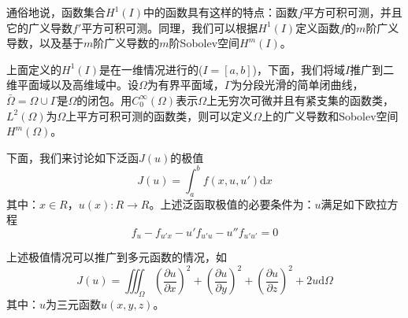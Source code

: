             通俗地说，函数集合$H^1(I)$中的函数具有这样的特点：函数$f$平方可积可测，并且它的广义导数$f'$平方可积可测。同理，我们可以根据$H^1(I)$定义函数$f$的$m$阶广义导数，以及基于$m$阶广义导数的$m$阶Sobolev空间$H^m(I)$。
            \par
            上面定义的$H^1(I)$是在一维情况进行的($I = [a,b]$)，下面，我们将域$I$推广到二维平面域以及高维域中。设$\Omega$为有界平面域，$\Gamma$为分段光滑的简单闭曲线，$\bar{\Omega} = \Omega\cup \Gamma$是$\Omega$的闭包。用$C_0^\infty(\Omega)$表示$\Omega$上无穷次可微并且有紧支集的函数类，$L^2(\Omega)$为$\Omega$上平方可积可测的函数类，则可以定义$\Omega$上的广义导数和Sobolev空间$H^m(\Omega)$。
            \par
            下面，我们来讨论如下泛函$J(u)$的极值
            \[
                J(u) = \int_a^b f(x,u,u') \mathrm{d}x
            \]
            其中：$x \in R$，$u(x):R \rightarrow R$。上述泛函取极值的必要条件为：$u$满足如下欧拉方程
            \[
                f_u -f_{u'x} - u'f_{u'u} - u''f_{u'u'} = 0
            \]
            \par
            上述极值情况可以推广到多元函数的情况，如
            \[
                J(u) = \iiint_\Omega \left( \frac{\partial u}{\partial x}\right)^2 + \left( \frac{\partial u}{\partial y}\right)^2 +\left( \frac{\partial u}{\partial z}\right)^2 +2u \mathrm{d}\Omega
            \]
            其中：$u$为三元函数$u(x,y,z)$。


